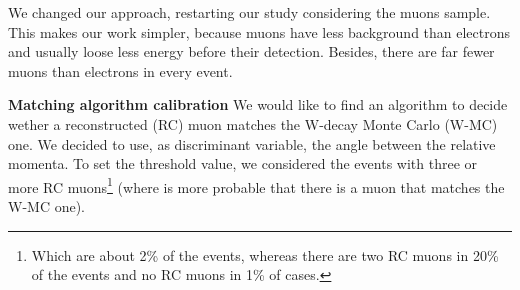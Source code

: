 We changed our approach, restarting our study considering the muons sample. This makes our work simpler, because muons have less background than electrons and usually loose less energy before their detection. Besides, there are far fewer muons than electrons in every event.

\textbf{Matching algorithm calibration}
We would like to find an algorithm to decide wether a reconstructed (RC) muon matches the W-decay Monte Carlo (W-MC) one. We decided to use, as discriminant variable, the angle between the relative momenta. To set the threshold value, we considered the events with three or more RC muons\footnote{Which are about 2\% of the events, whereas there are two RC muons in 20\% of the events and no RC muons in 1\% of cases.} (where is more probable that there is a muon that matches the W-MC one).